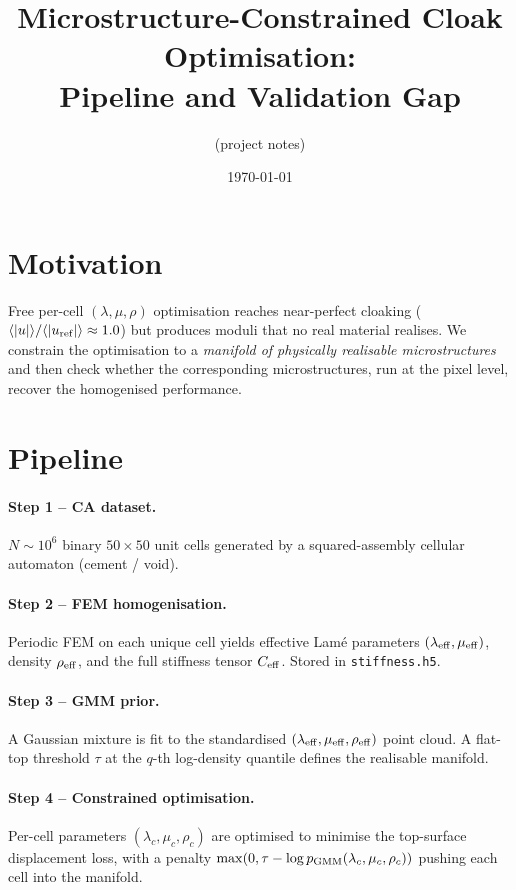\documentclass[11pt,a4paper]{article}
\title{Microstructure-Constrained Cloak Optimisation:\\
Pipeline and Validation Gap}
\author{(project notes)}
\date{\today}
\begin{document}
\maketitle

\section{Motivation}
Free per-cell $(\lambda,\mu,\rho)$ optimisation reaches near-perfect cloaking
($\langle|u|\rangle/\langle|u_{\rm ref}|\rangle \approx 1.0$) but produces
moduli that no real material realises. We constrain the optimisation to a
\emph{manifold of physically realisable microstructures} and then check
whether the corresponding microstructures, run at the pixel level, recover
the homogenised performance.

\section{Pipeline}

\paragraph{Step 1 -- CA dataset.}
$N{\sim}10^{6}$ binary $50\times 50$ unit cells generated by a
squared-assembly cellular automaton (cement / void).

\paragraph{Step 2 -- FEM homogenisation.}
Periodic FEM on each unique cell yields effective Lam\'e parameters
$(\lambda_{\rm eff},\mu_{\rm eff})$, density $\rho_{\rm eff}$, and the full
stiffness tensor $C_{\rm eff}$. Stored in \texttt{stiffness.h5}.

\paragraph{Step 3 -- GMM prior.}
A Gaussian mixture is fit to the standardised
$(\lambda_{\rm eff},\mu_{\rm eff},\rho_{\rm eff})$ point cloud. A flat-top
threshold $\tau$ at the $q$-th log-density quantile defines the realisable
manifold.

\paragraph{Step 4 -- Constrained optimisation.}
Per-cell parameters $(\lambda_c,\mu_c,\rho_c)$ are optimised to minimise the
top-surface displacement loss, with a penalty
$\max(0,\tau-\log p_{\rm GMM}(\lambda_c,\mu_c,\rho_c))$ pushing each cell
into the manifold.
\end{document}
